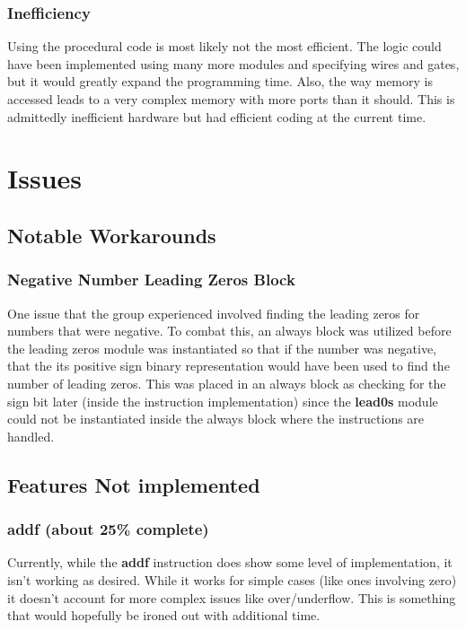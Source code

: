 \documentclass[conference]{IEEEtran}
\begin{document}
\subsubsection{Inefficiency}
Using the procedural code is most likely not the most efficient. The logic could have been implemented
using many more modules and specifying wires and gates, but it would greatly expand the programming
time. Also, the way memory is accessed leads to a very complex memory with more ports than it should.
This is admittedly inefficient hardware but had efficient coding at the current time.

\section{Issues}
\subsection{Notable Workarounds}
\subsubsection{Negative Number Leading Zeros Block}
One issue that the group experienced involved finding the leading zeros for numbers that were 
negative. To combat this, an always block was utilized before the leading zeros module was instantiated
so that if the number was negative, that the its positive sign binary representation would have been
used to find the number of leading zeros. This was placed in an always block as checking for the sign bit later 
(inside the instruction implementation) since the \textbf{lead0s} module could not be instantiated inside
the always block where the instructions are handled. 



\subsection{Features Not implemented}
\subsubsection{addf (about 25\% complete)}
Currently, while the \textbf{addf} instruction does show some level of implementation, it isn't 
working as desired.  While it works for simple cases (like ones involving zero) it doesn't account for more
complex issues like over/underflow. This is something that would hopefully be ironed out with additional time. 
\end{document}
